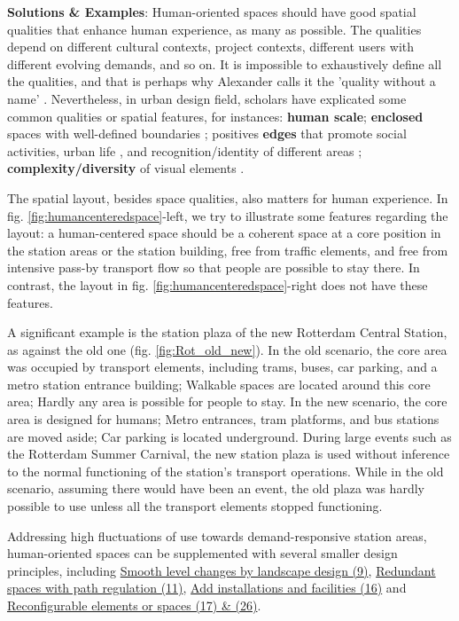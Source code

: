 \documentclass{article}
\begin{document}
\textbf{Solutions \& Examples}: Human-oriented spaces should have good spatial qualities that enhance human experience, as many as possible. The qualities depend on different cultural contexts, project contexts, different users with different evolving demands, and so on. It is impossible to exhaustively define all the qualities, and that is perhaps why Alexander calls it the 'quality without a name' \citep{alexanderTimelessWayBuilding1979}. Nevertheless, in urban design field, scholars have explicated some common qualities or spatial features, for instances: \textbf{human scale}; \textbf{enclosed} spaces with well-defined boundaries \citep{sitteCityPlanningAccording1889}; positives \textbf{edges} that promote social activities, urban life \citep{gehlLifeBuildings1987, whyteSocialLifeSmall2001}, and recognition/identity of different areas \citep{jacobsDeathLifeGreat1961, lynchImageCity1960}; \textbf{complexity/diversity} of visual elements \citep{ewingMeasuringUnmeasurableUrban2009}. 

The spatial layout, besides space qualities, also matters for human experience.  In fig. \ref{fig:humancenteredspace}-left, we try to illustrate some features regarding the layout: a human-centered space should be a coherent space at a core position in the station areas or the station building, free from traffic elements, and free from intensive pass-by transport flow so that people are possible to stay there. In contrast, the layout in fig. \ref{fig:humancenteredspace}-right does not have these features.

A significant example is the station plaza of the new Rotterdam Central Station, as against the old one (fig. \ref{fig:Rot_old_new}). In the old scenario, the core area was occupied by transport elements, including trams, buses, car parking, and a metro station entrance building; Walkable spaces are located around this core area; Hardly any area is possible for people to stay. In the new scenario, the core area is designed for humans; Metro entrances, tram platforms, and bus stations are moved aside; Car parking is located underground. During large events such as the Rotterdam Summer Carnival, the new station plaza is used without inference to the normal functioning of the station's transport operations. While in the old scenario, assuming there would have been an event, the old plaza was hardly possible to use unless all the transport elements stopped functioning.

Addressing high fluctuations of use towards demand-responsive station areas, human-oriented spaces can be supplemented with several smaller design principles, including \hyperref[(9 10) Smooth level changes by landscape design]{Smooth level changes by landscape design (9)}, \hyperref[(11) Adaptive redundant spaces with path regulation]{Redundant spaces with path regulation (11)}, \hyperref[(16) Add installations and facilities]{Add installations and facilities (16)} and \hyperref[(17 26) Reconfigurable elements or spaces]{Reconfigurable elements or spaces (17) \& (26)}.
\end{document}
